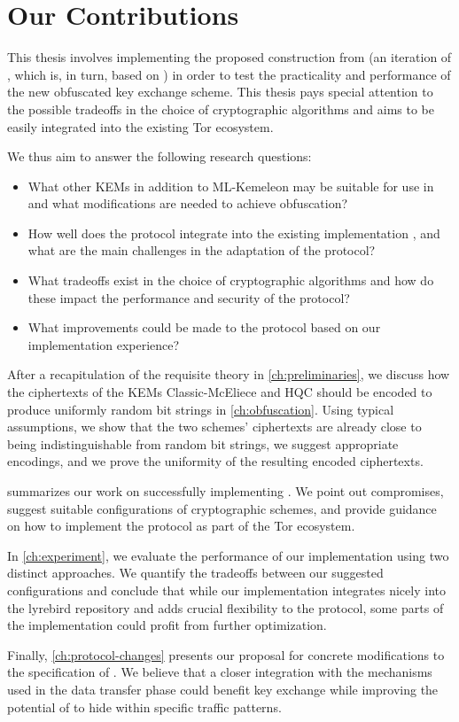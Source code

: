 \section{Our Contributions} \label{sec:contributions}

This thesis involves implementing the proposed \drivel{} construction from \cite{EPRINT:GRSV25} (an iteration of \pqobfs{}, which is, in turn, based on \obfsfour{}) in order to test the practicality and performance of the new obfuscated key exchange scheme.
This thesis pays special attention to the possible tradeoffs in the choice of cryptographic algorithms and aims to be easily integrated into the existing Tor ecosystem.

We thus aim to answer the following research questions:
\begin{itemize}
    \item What other KEMs in addition to ML-Kemeleon may be suitable for use in \drivel{} and what modifications are needed to achieve obfuscation?
    
    \item How well does the \drivel{} protocol integrate into the existing \obfsfour{} implementation \cite{lyrebird}, and what are the main challenges in the adaptation of the protocol?
    
    \item What tradeoffs exist in the choice of cryptographic algorithms and how do these impact the performance and security of the protocol?
    
    \item What improvements could be made to the \drivel{} protocol based on our implementation experience?
\end{itemize}

After a recapitulation of the requisite theory in \cref{ch:preliminaries}, we discuss how the ciphertexts of the KEMs Classic-McEliece and HQC should be encoded to produce uniformly random bit strings in \cref{ch:obfuscation}. Using typical assumptions, we show that the two schemes' ciphertexts are already close to being indistinguishable from random bit strings, we suggest appropriate encodings, and we prove the uniformity of the resulting encoded ciphertexts.

 summarizes our work on successfully implementing \drivel{}. We point out compromises, suggest suitable configurations of cryptographic schemes, and provide guidance on how to implement the \drivel{} protocol as part of the Tor ecosystem.

In \cref{ch:experiment}, we evaluate the performance of our implementation using two distinct approaches. We quantify the tradeoffs between our suggested configurations and conclude that while our implementation integrates nicely into the lyrebird repository and adds crucial flexibility to the protocol, some parts of the implementation could profit from further optimization.

Finally, \cref{ch:protocol-changes} presents our proposal for concrete modifications to the \drivel{} specification of \cite{EPRINT:GRSV25}. We believe that a closer integration with the mechanisms used in the data transfer phase could benefit key exchange while improving the potential of \drivel{} to hide within specific traffic patterns.
